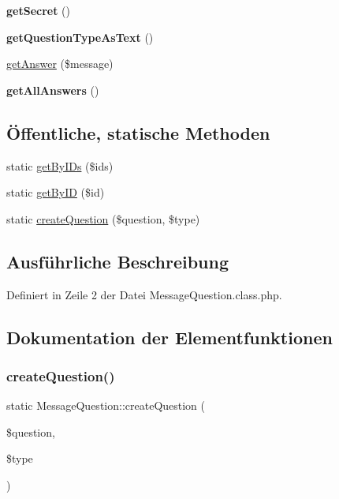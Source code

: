 \begin{DoxyCompactItemize}
\mbox{\label{class_message_question_af599e990aad43f7ce231b4645d7be15c}} 
{\bfseries get\+Secret} ()
\item 
\mbox{\label{class_message_question_a3796a3e47ada2da867436bed8d986f3e}} 
{\bfseries get\+Question\+Type\+As\+Text} ()
\item 
\mbox{\hyperlink{class_message_question_a67d79c73e8ef4761bc8d406a0709be88}{get\+Answer}} (\$message)
\item 
\mbox{\label{class_message_question_ae4d8ac7dc77b4f85d1d46fa5e1a3bd5d}} 
{\bfseries get\+All\+Answers} ()
\end{DoxyCompactItemize}
\subsection*{Öffentliche, statische Methoden}
\begin{DoxyCompactItemize}
\item 
static \mbox{\hyperlink{class_message_question_a1b58be7defeb60720a37e8c53bdbd33a}{get\+By\+I\+Ds}} (\$ids)
\item 
static \mbox{\hyperlink{class_message_question_a77b0e6eddf6ae6d2d240f4911c43f773}{get\+By\+ID}} (\$id)
\item 
static \mbox{\hyperlink{class_message_question_aa4c319c0c36ec2a3a7ce189013d87093}{create\+Question}} (\$question, \$type)
\end{DoxyCompactItemize}


\subsection{Ausführliche Beschreibung}


Definiert in Zeile 2 der Datei Message\+Question.\+class.\+php.



\subsection{Dokumentation der Elementfunktionen}
\mbox{\label{class_message_question_aa4c319c0c36ec2a3a7ce189013d87093}} 
\subsubsection{\texorpdfstring{create\+Question()}{createQuestion()}}
{\footnotesize\ttfamily static Message\+Question\+::create\+Question (\begin{DoxyParamCaption}\item[{}]{\$question,  }\item[{}]{\$type }\end{DoxyParamCaption})\hspace{0.3cm}{\ttfamily [static]}}



